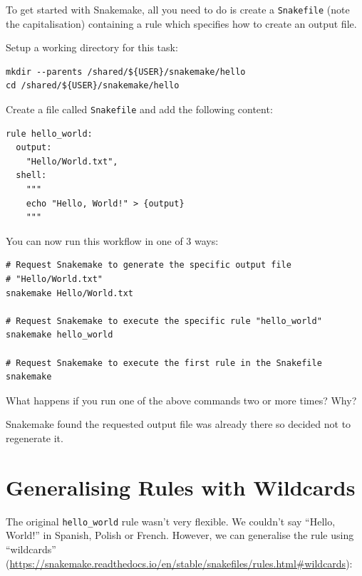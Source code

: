 To get started with Snakemake, all you need to do is create a \texttt{Snakefile} (note the capitalisation) containing a rule
which specifies how to create an output file.

Setup a working directory for this task:

\begin{lstlisting}
mkdir --parents /shared/${USER}/snakemake/hello
cd /shared/${USER}/snakemake/hello
\end{lstlisting}

Create a file called \texttt{Snakefile} and add the following content:

\begin{lstlisting}
rule hello_world:
  output:
    "Hello/World.txt",
  shell:
    """
    echo "Hello, World!" > {output}
    """
\end{lstlisting}

You can now run this workflow in one of 3 ways:

\begin{lstlisting}
# Request Snakemake to generate the specific output file
# "Hello/World.txt"
snakemake Hello/World.txt

# Request Snakemake to execute the specific rule "hello_world"
snakemake hello_world

# Request Snakemake to execute the first rule in the Snakefile
snakemake
\end{lstlisting}

\begin{questions}

What happens if you run one of the above commands two or more times? Why?

\begin{answer}
Snakemake found the requested output file was already there so decided not to regenerate it.
\end{answer}

\end{questions}


\section{Generalising Rules with Wildcards}

The original \texttt{hello\_world} rule wasn't very flexible. We couldn't say ``Hello, World!'' in Spanish, Polish
or French. However, we can generalise the rule using ``wildcards'' (\url{https://snakemake.readthedocs.io/en/stable/snakefiles/rules.html#wildcards}):

